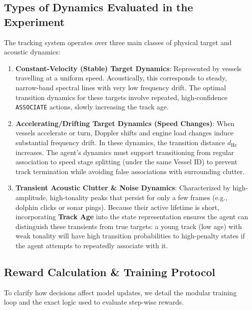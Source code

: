 \documentclass[12pt,a4paper]{article}
\begin{document}
\subsection{Types of Dynamics Evaluated in the Experiment}
The tracking system operates over three main classes of physical target and acoustic dynamics:
\begin{enumerate}
    \item \textbf{Constant-Velocity (Stable) Target Dynamics}: Represented by vessels travelling at a uniform speed. Acoustically, this corresponds to steady, narrow-band spectral lines with very low frequency drift. The optimal transition dynamics for these targets involve repeated, high-confidence \texttt{ASSOCIATE} actions, slowly increasing the track age.
    \item \textbf{Accelerating/Drifting Target Dynamics (Speed Changes)}: When vessels accelerate or turn, Doppler shifts and engine load changes induce substantial frequency drift. In these dynamics, the transition distance $d_{\text{Hz}}$ increases. The agent's dynamics must support transitioning from regular association to speed stage splitting (under the same Vessel ID) to prevent track termination while avoiding false associations with surrounding clutter.
    \item \textbf{Transient Acoustic Clutter \& Noise Dynamics}: Characterized by high-amplitude, high-tonality peaks that persist for only a few frames (e.g., dolphin clicks or sonar pings). Because their active lifetime is short, incorporating \textbf{Track Age} into the state representation ensures the agent can distinguish these transients from true targets: a young track (low age) with weak tonality will have high transition probabilities to high-penalty states if the agent attempts to repeatedly associate with it.
\end{enumerate}

\subsection{Reward Calculation \& Training Protocol}
To clarify how decisions affect model updates, we detail the modular training loop and the exact logic used to evaluate step-wise rewards.
\end{document}
